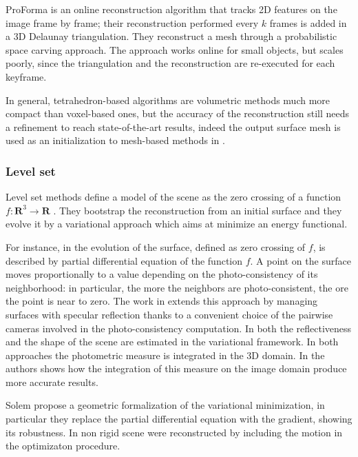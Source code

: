 ProForma \cite{Pan_et_al09} is an online reconstruction algorithm that tracks 2D features on the image frame by frame; their reconstruction performed every $k$ frames is added in a 3D Delaunay triangulation. They reconstruct a mesh through a probabilistic space carving approach. The approach works online for small objects, but scales poorly, since the triangulation and the reconstruction are re-executed for each keyframe.

In general, tetrahedron-based algorithms are volumetric methods  much more compact than voxel-based ones, but the accuracy of the reconstruction still needs a refinement to reach state-of-the-art results, indeed the output surface mesh is used as an initialization to mesh-based methods in \cite{vu_et_al_2012,hiep2009towards,salman2010surface}.

\subsubsection{Level set}
Level set methods define a model of the scene as the zero crossing of a function $f:\mathbf{R}^3\rightarrow\mathbf{R}$ \cite{faugeras2002variational,jin2002variational,yezzi2003stereoscopic,fuhrmann2014floating,solem2005geometric,yoon2010joint,pons2007multi}. 
They bootstrap the reconstruction from an initial surface and they evolve it by a variational approach which aims at minimize an energy functional.

For instance, in \cite{faugeras2002variational} the evolution of the surface, defined as zero crossing of $f$, is described by partial differential equation of the function $f$. A point on the surface moves proportionally to a value depending on the photo-consistency of its neighborhood: in particular, the more the neighbors are photo-consistent, the ore the point is near to zero.
The work in \cite{jin2002variational} extends this approach by managing surfaces with specular reflection thanks to a convenient choice of the pairwise cameras involved in the photo-consistency computation. In \cite{yoon2010joint} both the reflectiveness and the shape of the scene are estimated in the variational framework.
In both approaches the photometric measure is integrated in the 3D domain. In \cite{yezzi2003stereoscopic} the authors shows how the integration of this measure on the image domain produce more accurate results.

Solem \etal \cite{solem2005geometric} propose a geometric formalization of the variational minimization, in particular they replace the partial differential equation with the gradient, showing its robustness.
In \cite{pons2005modelling,pons2007multi} non rigid scene were reconstructed by including the motion in the optimizaton procedure.

